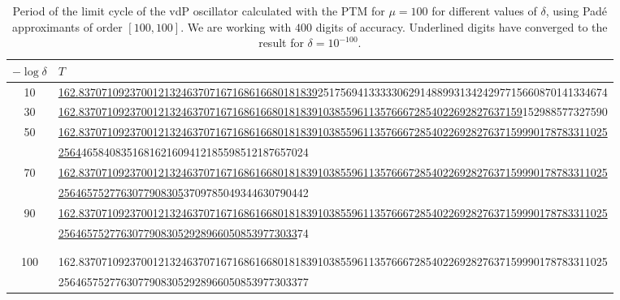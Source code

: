 \documentclass[final]{article}
\begin{document}
\begin{table}
	\caption{Period of the limit cycle of the vdP oscillator calculated with the PTM for $\mu=100$ for different values of $\delta$, using Pad\'e approximants of order $[100,100]$. We are working with $400$ digits of accuracy. Underlined digits have converged to the result for $\delta=10^{-100}$.}
	\bigskip
	\label{table_T_100_vdP}
	\begin{tabular}{|c|l|}
		\hline
		$-\log \delta$ &   $T$    \\
		\hline
		10	&   \underline{162.837071092370012132463707167168616680181839}251756941333330629148899313424297715660870141334674 \\
		30	&   \underline{162.837071092370012132463707167168616680181839103855961135766672854022692827637159}152988577327590 \\
		50	&   \underline{162.837071092370012132463707167168616680181839103855961135766672854022692827637159990178783311025} \\
		&   \hspace{0.5cm} \underline{2564}4658408351681621609412185598512187657024 \\
		70	&   \underline{162.837071092370012132463707167168616680181839103855961135766672854022692827637159990178783311025} \\
		&   \hspace{0.5cm} \underline{2564657527763077908305}3709785049344630790442 \\
		90 	&   \underline{162.837071092370012132463707167168616680181839103855961135766672854022692827637159990178783311025} \\
		&   \hspace{0.5cm} \underline{256465752776307790830529289660508539773033}74 \\
		& \\
		\hline \hline
		& \\
		100 &	162.837071092370012132463707167168616680181839103855961135766672854022692827637159990178783311025 \\
		&   \hspace{0.5cm} 25646575277630779083052928966050853977303377 \\
		\hline
		\hline
	\end{tabular}
	\bigskip\bigskip
\end{table}
\end{document}
